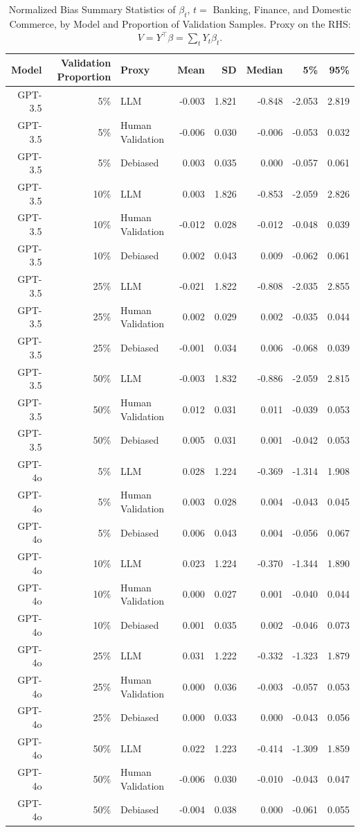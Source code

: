 \begin{table}

\caption{Normalized Bias Summary Statistics of $\beta_{t}$, $t=$ Banking, Finance, and Domestic Commerce, by Model and Proportion of Validation Samples.
      Proxy on the RHS: $V = Y^\top \beta = \sum_{t} Y_t \beta_t$.}
\centering
\begin{tabular}[t]{rrlrrrrr}
\toprule
Model & Validation Proportion & Proxy & Mean & SD & Median & 5\% & 95\%\\
\midrule
GPT-3.5 & 5\% & LLM & -0.003 & 1.821 & -0.848 & -2.053 & 2.819\\
GPT-3.5 & 5\% & Human Validation & -0.006 & 0.030 & -0.006 & -0.053 & 0.032\\
GPT-3.5 & 5\% & Debiased & 0.003 & 0.035 & 0.000 & -0.057 & 0.061\\
GPT-3.5 & 10\% & LLM & 0.003 & 1.826 & -0.853 & -2.059 & 2.826\\
GPT-3.5 & 10\% & Human Validation & -0.012 & 0.028 & -0.012 & -0.048 & 0.039\\
GPT-3.5 & 10\% & Debiased & 0.002 & 0.043 & 0.009 & -0.062 & 0.061\\
GPT-3.5 & 25\% & LLM & -0.021 & 1.822 & -0.808 & -2.035 & 2.855\\
GPT-3.5 & 25\% & Human Validation & 0.002 & 0.029 & 0.002 & -0.035 & 0.044\\
GPT-3.5 & 25\% & Debiased & -0.001 & 0.034 & 0.006 & -0.068 & 0.039\\
GPT-3.5 & 50\% & LLM & -0.003 & 1.832 & -0.886 & -2.059 & 2.815\\
GPT-3.5 & 50\% & Human Validation & 0.012 & 0.031 & 0.011 & -0.039 & 0.053\\
GPT-3.5 & 50\% & Debiased & 0.005 & 0.031 & 0.001 & -0.042 & 0.053\\
GPT-4o & 5\% & LLM & 0.028 & 1.224 & -0.369 & -1.314 & 1.908\\
GPT-4o & 5\% & Human Validation & 0.003 & 0.028 & 0.004 & -0.043 & 0.045\\
GPT-4o & 5\% & Debiased & 0.006 & 0.043 & 0.004 & -0.056 & 0.067\\
GPT-4o & 10\% & LLM & 0.023 & 1.224 & -0.370 & -1.344 & 1.890\\
GPT-4o & 10\% & Human Validation & 0.000 & 0.027 & 0.001 & -0.040 & 0.044\\
GPT-4o & 10\% & Debiased & 0.001 & 0.035 & 0.002 & -0.046 & 0.073\\
GPT-4o & 25\% & LLM & 0.031 & 1.222 & -0.332 & -1.323 & 1.879\\
GPT-4o & 25\% & Human Validation & 0.000 & 0.036 & -0.003 & -0.057 & 0.053\\
GPT-4o & 25\% & Debiased & 0.000 & 0.033 & 0.000 & -0.043 & 0.056\\
GPT-4o & 50\% & LLM & 0.022 & 1.223 & -0.414 & -1.309 & 1.859\\
GPT-4o & 50\% & Human Validation & -0.006 & 0.030 & -0.010 & -0.043 & 0.047\\
GPT-4o & 50\% & Debiased & -0.004 & 0.038 & 0.000 & -0.061 & 0.055\\
\bottomrule
\end{tabular}
\end{table}
